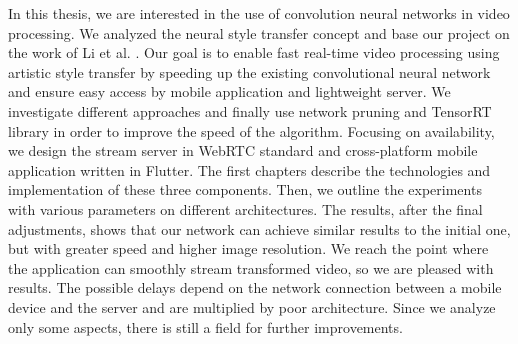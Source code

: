 \documentclass[../Main.tex]{subfiles}
\begin{document}
In this thesis, we are interested in the use of convolution neural networks in video processing. We analyzed the neural style transfer concept and base our project on the work of Li et al. \cite{Li2018}.
Our goal is to enable fast real-time video processing using artistic style transfer by speeding up the existing convolutional neural network and ensure easy access by mobile application and lightweight server.
We investigate different approaches and finally use network pruning and TensorRT library in order to improve the speed of the algorithm. Focusing on availability, we design the stream server in WebRTC standard and cross-platform mobile application written in Flutter. The first chapters describe the technologies and implementation of these three components. Then, we outline the experiments with various parameters on different architectures. 
The results, after the final adjustments, shows that our network can achieve similar results to the initial one, but with greater speed and higher image resolution. We reach the point where the application can smoothly stream transformed video, so we are pleased with results. The possible delays depend on the network connection between a mobile device and the server and are multiplied by poor architecture. Since we analyze only some aspects, there is still a field for further improvements.

\par\vspace*{\fill} %


\biblio %
\end{document}
